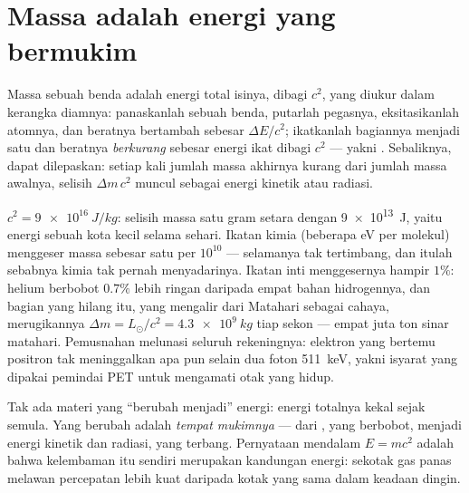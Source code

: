 \section{Massa adalah energi yang bermukim}

\begin{theorem}\label{thm:b3:relativistic-dynamics:emc2}
Massa sebuah benda adalah energi total isinya, dibagi $c^2$, yang
diukur dalam kerangka diamnya: panaskanlah sebuah benda, putarlah
pegasnya, eksitasikanlah atomnya, dan beratnya bertambah sebesar
$\Delta E/c^2$; ikatkanlah bagiannya menjadi satu dan beratnya
\emph{berkurang} sebesar energi ikat dibagi $c^2$ --- yakni \emph{}. Sebaliknya,  dapat dilepaskan: setiap kali jumlah
massa akhirnya kurang dari jumlah massa awalnya, selisih $\Delta m\,c^2$
muncul sebagai energi kinetik atau radiasi.
\end{theorem}
\admitted

\begin{example}[Pembukuan $c^2$]\label{ex:b3:relativistic-dynamics:ledger}
$c^2 = \qty{9e16}{J/kg}$: selisih massa satu gram setara dengan
\qty{9e13}{J}, yaitu energi sebuah kota kecil selama sehari. Ikatan
kimia (beberapa eV per molekul) menggeser massa sebesar satu per
$10^{10}$ --- selamanya tak tertimbang, dan itulah sebabnya kimia tak
pernah menyadarinya. Ikatan inti menggesernya hampir $1\%$: helium
berbobot $0.7\%$ lebih ringan daripada empat bahan hidrogennya, dan
bagian yang hilang itu, yang mengalir dari Matahari sebagai cahaya,
merugikannya $\Delta m = L_\odot/c^2 =
\qty{4.3e9}{kg}$ tiap sekon --- empat juta ton sinar matahari.
Pemusnahan melunasi seluruh rekeningnya: elektron yang bertemu
positron tak meninggalkan apa pun selain dua foton \qty{511}{keV},
yakni isyarat yang dipakai pemindai PET untuk mengamati otak yang hidup.
\end{example}

\begin{remark}\label{rem:b3:relativistic-dynamics:conversion}
Tak ada materi yang ``berubah menjadi'' energi: energi totalnya kekal
sejak semula. Yang berubah adalah \emph{tempat mukimnya} --- dari , yang berbobot, menjadi energi kinetik dan radiasi, yang terbang.
Pernyataan mendalam $E = mc^2$ adalah bahwa kelembaman itu sendiri
merupakan kandungan energi: sekotak gas panas melawan percepatan lebih
kuat daripada kotak yang sama dalam keadaan dingin.
\end{remark}

